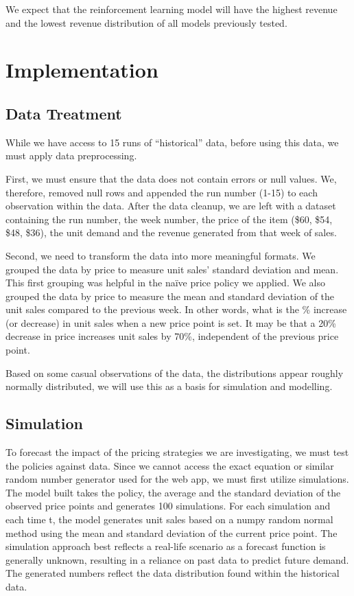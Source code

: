 \documentclass[11pt,a4paper]{article}
\begin{document}
We expect that the reinforcement learning model will have the highest revenue and the lowest revenue distribution of all models previously tested.

\section{Implementation}

\subsection{Data Treatment}
While we have access to 15 runs of “historical” data, before using this data, we must apply data preprocessing.

First, we must ensure that the data does not contain errors or null values. 
We, therefore, removed null rows and appended the run number (1-15) to each observation within the data. 
After the data cleanup, we are left with a dataset containing the run number, the week number, the price of the item (\$60, \$54, \$48, \$36), the unit demand and the revenue generated from that week of sales.

Second, we need to transform the data into more meaningful formats. We grouped the data by price to measure unit sales’ standard deviation and mean. This first grouping was helpful in the naïve price policy we applied. 
We also grouped the data by price to measure the mean and standard deviation of the unit sales compared to the previous week. In other words, what is the \% increase (or decrease) in unit sales when a new price point is set. 
It may be that a 20\% decrease in price increases unit sales by 70\%, independent of the previous price point.

Based on some casual observations of the data, the distributions appear roughly normally distributed, we will use this as a basis for simulation and modelling.

\subsection{Simulation}
To forecast the impact of the pricing strategies we are investigating, we must test the policies against data. 
Since we cannot access the exact equation or similar random number generator used for the web app, we must first utilize simulations. 
The model built takes the policy, the average and the standard deviation of the observed price points and generates 100 simulations. 
For each simulation and each time t, the model generates unit sales based on a numpy random normal method using the mean and standard deviation of the current price point. 
The simulation approach best reflects a real-life scenario as a forecast function is generally unknown, resulting in a reliance on past data to predict future demand. 
The generated numbers reflect the data distribution found within the historical data.
\end{document}
